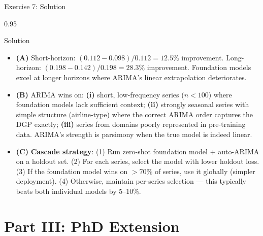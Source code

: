 \documentclass[9pt, aspectratio=169, t]{beamer}
\begin{document}
\begin{frame}{Exercise 7: Solution}
    \begin{cminipage}{0.95\textwidth}
    \begin{exampleblock}{Solution}
        {\small
        \begin{itemize}\setlength{\itemsep}{3pt}
            \item \textcolor{MainBlue}{\textbf{(A)}} Short-horizon: $(0.112 - 0.098)/0.112 = \mathbf{12.5\%}$ improvement. Long-horizon: $(0.198 - 0.142)/0.198 = \mathbf{28.3\%}$ improvement. Foundation models excel at longer horizons where ARIMA's linear extrapolation deteriorates.
            \item \textcolor{MainBlue}{\textbf{(B)}} ARIMA wins on: \textbf{(i)} short, low-frequency series ($n < 100$) where foundation models lack sufficient context; \textbf{(ii)} strongly seasonal series with simple structure (airline-type) where the correct ARIMA order captures the DGP exactly; \textbf{(iii)} series from domains poorly represented in pre-training data. ARIMA's strength is parsimony when the true model is indeed linear.
            \item \textcolor{MainBlue}{\textbf{(C)}} \textbf{Cascade strategy}: (1) Run zero-shot foundation model + auto-ARIMA on a holdout set. (2) For each series, select the model with lower holdout loss. (3) If the foundation model wins on $> 70\%$ of series, use it globally (simpler deployment). (4) Otherwise, maintain per-series selection --- this typically beats both individual models by 5--10\%.
        \end{itemize}
        }
    \end{exampleblock}
    \end{cminipage}
\end{frame}

\section{Part III: PhD Extension}
\end{document}
